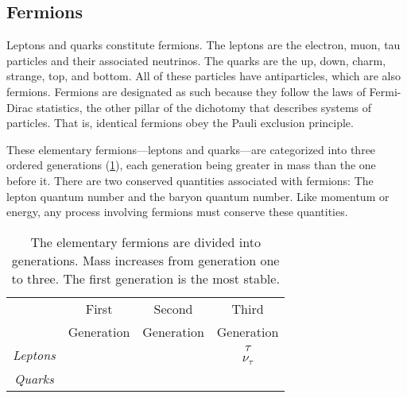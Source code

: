 	\subsection{Fermions}
	\label{sec:fermions}

	Leptons and quarks constitute fermions. The leptons are the electron, muon, tau particles and their associated neutrinos. The quarks are the up, down, charm, strange, top, and bottom. All of these particles have antiparticles, which are also fermions. Fermions are designated as such because they follow the laws of Fermi-Dirac statistics, the other pillar of the dichotomy that describes systems of particles. That is, identical fermions obey the Pauli exclusion principle. 

	These elementary fermions---leptons and quarks---are categorized into three ordered generations (\TAB \ref{table:leptons}), each generation being greater in mass than the one before it. There are two conserved quantities associated with fermions: The lepton quantum number and the baryon quantum number. Like momentum or energy, any process involving fermions must conserve these quantities. 

	\begin{table}[H]
		\centering
		\captionsetup{width=4in}
		\caption[The Elementary Fermions]{The elementary fermions are divided into generations. Mass increases from generation one to three. The first generation is the most stable.}
		\label{table:leptons}
		\begin{tabular}{cccc}
			\toprule
			 & First & Second & Third \\
			 & Generation & Generation & Generation \\
			\midrule
			\multirow{2}{*}{\emph{Leptons}} & \HepParticle{\Pelectron} & \HepParticle{\Pmu} & $\tau$ \\ 
			 & \HepParticle{\Pnue} & \HepParticle{\Pnum} & $\nu_{\tau}$ \\
			\midrule
			\multirow{2}{*}{\emph{Quarks}} & \HepParticle{\Pup}{}{} & \HepParticle{\Pcharm}{}{} & \HepParticle{\Ptop}{}{} \\
			 & \HepParticle{\Pdown}{}{} & \HepParticle{\Pstrange}{}{} & \HepParticle{\Pbottom}{}{} \\
			\bottomrule
		\end{tabular}
	\end{table}


